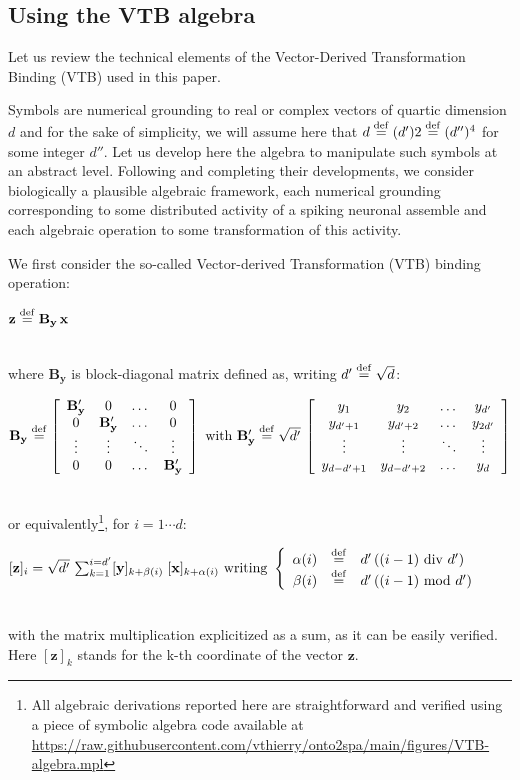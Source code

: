 \documentclass[sn-mathphys]{sn-jnl}
\newcommand{\defq}{\stackrel {\rm def}{=}}
\newcommand{\eqline}[1]{~\vspace{0.1cm}\\\centerline{$#1$}\vspace{0.1cm}\\}
\begin{document}
\begin{appendices}

\section{Using the VTB algebra} \label{VTB-algebra}

Let us review the technical elements of the Vector-Derived Transformation Binding (VTB) used in this paper.

Symbols are numerical grounding to real or complex vectors of quartic dimension $d$ and for the sake of simplicity, we will assume here that $d \defq (d')2 \defq (d'')^4$ for some integer $d''$. Let us develop here the algebra to manipulate such symbols at an abstract level. Following \cite{gosmann_vector-derived_2019} and completing their developments, we consider biologically a plausible algebraic framework, each numerical grounding corresponding to some distributed  activity of a spiking neuronal assemble and each algebraic operation to some transformation of this activity.

We first consider the so-called Vector-derived Transformation (VTB) binding operation:
\eqline{\mathbf{z} \defq \mathbf{B_y} \, \mathbf{x}}
where $\mathbf{B_y}$ is block-diagonal matrix defined as, writing $d' \defq \sqrt{d}$:
\eqline{\mathbf{B_y} \defq 
\left[\begin{array}{cccc}
    \mathbf{B_y'} &    0 & \dots &   0 \\
       0 & \mathbf{B_y'} & \dots &    0 \\
    \vdots & \vdots & \ddots & \vdots  \\
       0 &    0 & \dots & \mathbf{B_y'}
    \end{array}\right]
\mbox{ with } 
\mathbf{B_y'}  \defq  \sqrt{d'} \,
\left[\begin{array}{cccc}
    y_1            & y_2            & \dots  & y_{d'}  \\
    y_{d' + 1}     & y_{d' + 2}     & \dots  & y_{2d'} \\
    \vdots         & \vdots         & \ddots & \vdots  \\
    y_{d - d' + 1} & y_{d - d' + 2} & \dots  & y_d
\end{array}\right]}
or equivalently\footnote{All algebraic derivations reported here are straightforward and verified using a piece of symbolic algebra code available at \url{https://raw.githubusercontent.com/vthierry/onto2spa/main/figures/VTB-algebra.mpl}}, for $i = 1 \cdots d$:
\eqline{[\mathbf{z}]_i = \sqrt{d'} \, \sum_{k = 1}^{i = d'} [\mathbf{y}]_{k + \beta(i)} \;
  [\mathbf{x}]_{k + \alpha(i)}
\mbox{ writing } \left\{\begin{array}{rcl}
  \alpha(i) &\defq& d' \, ((i-1) \mbox{ div } d') \\
  \beta(i)  &\defq& d' \, ((i-1) \mbox{ mod } d') \\
\end{array}\right.}
with the matrix multiplication explicitized as a sum, as it can be easily verified. Here $[\mathbf{z}]_k$ stands for the k-th coordinate of the vector $\mathbf{z}$.


\end{appendices}
\end{document}

